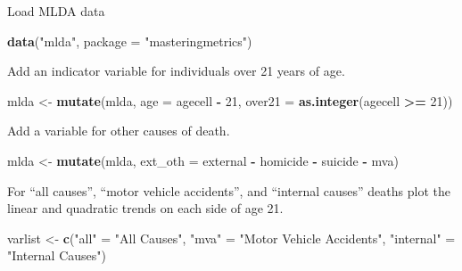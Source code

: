 \documentclass[]{book}
\newenvironment{Shaded}{\begin{snugshade}}{\end{snugshade}}
\newcommand{\DataTypeTok}[1]{\textcolor[rgb]{0.13,0.29,0.53}{#1}}
\newcommand{\DecValTok}[1]{\textcolor[rgb]{0.00,0.00,0.81}{#1}}
\newcommand{\KeywordTok}[1]{\textcolor[rgb]{0.13,0.29,0.53}{\textbf{#1}}}
\newcommand{\NormalTok}[1]{#1}
\newcommand{\OperatorTok}[1]{\textcolor[rgb]{0.81,0.36,0.00}{\textbf{#1}}}
\newcommand{\StringTok}[1]{\textcolor[rgb]{0.31,0.60,0.02}{#1}}
\theoremstyle{definition}
\theoremstyle{definition}
\theoremstyle{definition}
\theoremstyle{remark}
\begin{document}
Load MLDA data

\begin{Shaded}
\begin{Highlighting}[]
\KeywordTok{data}\NormalTok{(}\StringTok{"mlda"}\NormalTok{, }\DataTypeTok{package =} \StringTok{"masteringmetrics"}\NormalTok{)}
\end{Highlighting}
\end{Shaded}

Add an indicator variable for individuals over 21 years of age.

\begin{Shaded}
\begin{Highlighting}[]
\NormalTok{mlda <-}\StringTok{ }\KeywordTok{mutate}\NormalTok{(mlda,}
               \DataTypeTok{age =}\NormalTok{ agecell }\OperatorTok{-}\StringTok{ }\DecValTok{21}\NormalTok{,}
               \DataTypeTok{over21 =} \KeywordTok{as.integer}\NormalTok{(agecell }\OperatorTok{>=}\StringTok{ }\DecValTok{21}\NormalTok{))}
\end{Highlighting}
\end{Shaded}

Add a variable for other causes of death.

\begin{Shaded}
\begin{Highlighting}[]
\NormalTok{mlda <-}\StringTok{ }\KeywordTok{mutate}\NormalTok{(mlda, }\DataTypeTok{ext_oth =}\NormalTok{ external }\OperatorTok{-}\StringTok{ }\NormalTok{homicide }\OperatorTok{-}\StringTok{ }\NormalTok{suicide }\OperatorTok{-}\StringTok{ }\NormalTok{mva)}
\end{Highlighting}
\end{Shaded}

For ``all causes'', ``motor vehicle accidents'', and ``internal causes''
deaths plot the linear and quadratic trends on each side of age 21.

\begin{Shaded}
\begin{Highlighting}[]
\NormalTok{varlist <-}\StringTok{ }\KeywordTok{c}\NormalTok{(}\StringTok{"all"}\NormalTok{ =}\StringTok{ "All Causes"}\NormalTok{,}
             \StringTok{"mva"}\NormalTok{ =}\StringTok{ "Motor Vehicle Accidents"}\NormalTok{,}
             \StringTok{"internal"}\NormalTok{ =}\StringTok{ "Internal Causes"}\NormalTok{)}
\end{Highlighting}
\end{Shaded}
\end{document}
